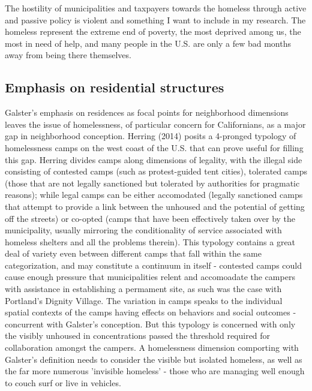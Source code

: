 The hostility of municipalities and taxpayers towards the homeless
through active and passive policy is violent and something I want to
include in my research. The homeless represent the extreme end of
poverty, the most deprived among us, the most in need of help, and
many people in the U.S. are only a few bad months away from being
there themselves.

\subsection{Emphasis on residential structures}
Galster's emphasis on residences as focal points for neighborhood
dimensions leaves the issue of homelessness, of particular concern for
Californians, as a major gap in neighborhood conception. Herring
(2014) posits a 4-pronged typology of homelessness camps on the west
coast of the U.S. that can prove useful for filling this gap. Herring
divides camps along dimensions of legality, with the illegal side
consisting of contested camps (such as protest-guided tent cities),
tolerated camps (those that are not legally sanctioned but tolerated
by authorities for pragmatic reasons); while legal camps can be either
accomodated (legally sanctioned camps that attempt to provide a link
between the unhoused and the potential of getting off the streets) or
co-opted (camps that have been effectively taken over by the
municipality, usually mirroring the conditionality of service
associated with homeless shelters and all the problems therein). This
typology contains a great deal of variety even between different camps
that fall within the same categorization, and may constitute a
continuum in itself - contested camps could cause enough pressure that
municipalities relent and accomoadate the campers with assistance in
establishing a permament site, as such was the case with Portland's
Dignity Village. The variation in camps speaks to the individual
spatial contexts of the camps having effects on behaviors and social
outcomes - concurrent with Galster's conception. But this typology is
concerned with only the visibly unhoused in concentrations passed the
threshold required for collaboration amongst the campers. A
homelessness dimension comporting with Galster's definition needs to
consider the visible but isolated homeless, as well as the far more
numerous 'invisible homeless' - those who are managing well enough to
couch surf or live in vehicles.

